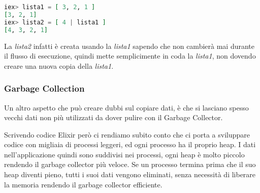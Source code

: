 \begin{lstlisting}[language=elixir]
iex> lista1 = [ 3, 2, 1 ]
[3, 2, 1]
iex> lista2 = [ 4 | lista1 ]
[4, 3, 2, 1]
\end{lstlisting}

La \textit{lista2} infatti è creata usando la \textit{lista1}
sapendo che non cambierà mai durante il flusso di esecuzione,
quindi mette semplicimente in coda la \textit{lista1}, non dovendo
creare una nuova copia della \textit{lista1}.

\subsubsection{Garbage Collection}
Un altro aspetto che può creare dubbi sul copiare dati, è che
si lasciano spesso vecchi dati non più utilizzati da dover
pulire con il Garbage Collector.

Scrivendo codice Elixir però ci rendiamo subito conto
che ci porta a sviluppare codice con migliaia di processi leggeri,
ed ogni processo ha il proprio heap. I dati nell'applicazione quindi
sono suddivisi nei processi, ogni heap è molto piccolo rendendo
il garbage collector più veloce. Se un processo termina prima che
il suo heap diventi pieno, tutti i suoi dati vengono eliminati, senza necessità
di liberare la memoria rendendo il garbage collector
efficiente. \cite{programming_elixir_immutability}

